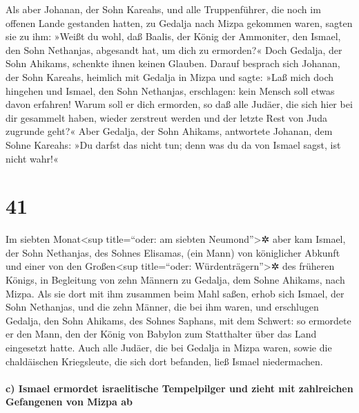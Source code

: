Als aber Johanan, der Sohn Kareahs, und alle
Truppenführer, die noch im offenen Lande gestanden hatten, zu Gedalja
nach Mizpa gekommen waren, sagten sie zu ihm: »Weißt du
wohl, daß Baalis, der König der Ammoniter, den Ismael, den Sohn
Nethanjas, abgesandt hat, um dich zu ermorden?« Doch Gedalja, der Sohn
Ahikams, schenkte ihnen keinen Glauben. Darauf besprach
sich Johanan, der Sohn Kareahs, heimlich mit Gedalja in Mizpa und sagte:
»Laß mich doch hingehen und Ismael, den Sohn Nethanjas, erschlagen: kein
Mensch soll etwas davon erfahren! Warum soll er dich ermorden, so daß
alle Judäer, die sich hier bei dir gesammelt haben, wieder zerstreut
werden und der letzte Rest von Juda zugrunde geht?« Aber
Gedalja, der Sohn Ahikams, antwortete Johanan, dem Sohne Kareahs: »Du
darfst das nicht tun; denn was du da von Ismael sagst, ist nicht wahr!«

\hypertarget{section-40}{%
\section{41}\label{section-40}}

Im siebten Monat\textless sup title=``oder: am siebten
Neumond''\textgreater✲ aber kam Ismael, der Sohn Nethanjas, des Sohnes
Elisamas, (ein Mann) von königlicher Abkunft und einer von den
Großen\textless sup title=``oder: Würdenträgern''\textgreater✲ des
früheren Königs, in Begleitung von zehn Männern zu Gedalja, dem Sohne
Ahikams, nach Mizpa. Als sie dort mit ihm zusammen beim Mahl saßen,
erhob sich Ismael, der Sohn Nethanjas, und die zehn
Männer, die bei ihm waren, und erschlugen Gedalja, den Sohn Ahikams, des
Sohnes Saphans, mit dem Schwert: so ermordete er den Mann, den der König
von Babylon zum Statthalter über das Land eingesetzt hatte.
Auch alle Judäer, die bei Gedalja in Mizpa waren, sowie
die chaldäischen Kriegsleute, die sich dort befanden, ließ Ismael
niedermachen.

\hypertarget{c-ismael-ermordet-israelitische-tempelpilger-und-zieht-mit-zahlreichen-gefangenen-von-mizpa-ab}{%
\paragraph{c) Ismael ermordet israelitische Tempelpilger und zieht mit
zahlreichen Gefangenen von Mizpa
ab}\label{c-ismael-ermordet-israelitische-tempelpilger-und-zieht-mit-zahlreichen-gefangenen-von-mizpa-ab}}


